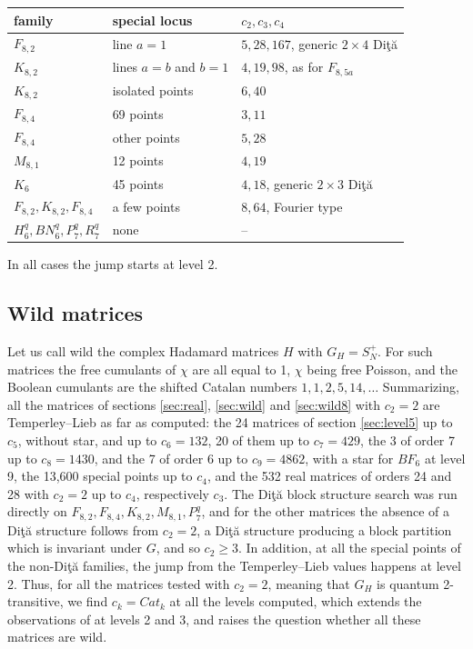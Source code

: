 \documentclass[11pt]{amsart}
\begin{document}
\medskip

\begin{center}
\begin{tabular}{lll}
\toprule
family & special locus & $c_2,c_3,c_4$\\
\midrule
$F_{8,2}$ & line $a=1$ & $5,28,167$, generic $2\times4$ Di\c t\u a\\
$K_{8,2}$ & lines $a=b$ and $b=1$ & $4,19,98$, as for $F_{8,5a}$\\
$K_{8,2}$ & isolated points & $6,40$\\
$F_{8,4}$ & 69 points & $3,11$\\
$F_{8,4}$ & other points & $5,28$\\
$M_{8,1}$ & 12 points & $4,19$\\
$K_6$ & 45 points & $4,18$, generic $2\times3$ Di\c t\u a\\
$F_{8,2},K_{8,2},F_{8,4}$ & a few points & $8,64$, Fourier type\\
$H_6^q,BN_6^q,P_7^q,R_7^q$ & none & --\\
\bottomrule
\end{tabular}
\end{center}

\medskip

\noindent In all cases the jump starts at level 2.

\subsection{Wild matrices}\label{sec:nondita}

Let us call wild the complex Hadamard matrices $H$ with $G_H=S_N^+$. For such matrices the free cumulants of $\chi$ are all equal to 1, $\chi$ being free Poisson, and the Boolean cumulants are the shifted Catalan numbers $1,1,2,5,14,\ldots$ Summarizing, all the matrices of sections \ref{sec:real}, \ref{sec:wild} and \ref{sec:wild8} with $c_2=2$ are Temperley--Lieb as far as computed: the 24 matrices of section \ref{sec:level5} up to $c_5$, without star, and up to $c_6=132$, 20 of them up to $c_7=429$, the 3 of order 7 up to $c_8=1430$, and the 7 of order 6 up to $c_9=4862$, with a star for $BF_6$ at level 9, the 13,600 special points up to $c_4$, and the 532 real matrices of orders 24 and 28 with $c_2=2$ up to $c_4$, respectively $c_3$. The Di\c t\u a block structure search was run directly on $F_{8,2},F_{8,4},K_{8,2},M_{8,1},P_7^q$, and for the other matrices the absence of a Di\c t\u a structure follows from $c_2=2$, a Di\c t\u a structure producing a block partition which is invariant under $G$, and so $c_2\geq3$. In addition, at all the special points of the non-Di\c t\u a families, the jump from the Temperley--Lieb values happens at level 2. Thus, for all the matrices tested with $c_2=2$, meaning that $G_H$ is quantum 2-transitive, we find $c_k=Cat_k$ at all the levels computed, which extends the observations of \cite{cn} at levels 2 and 3, and raises the question whether all these matrices are wild.
\end{document}
